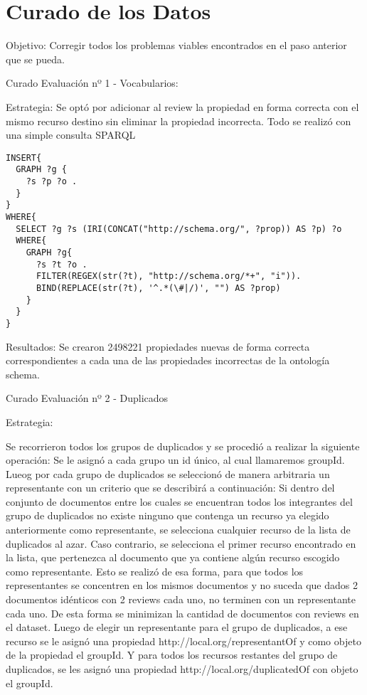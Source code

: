 \chapter{Curado de los Datos}
\label{chapter:curado}

Objetivo:
Corregir todos los problemas viables encontrados en el paso anterior que se pueda.

Curado Evaluación nº 1 - Vocabularios:

Estrategia:
Se optó por adicionar al review la propiedad en forma correcta con el mismo recurso destino sin eliminar la propiedad incorrecta. 
Todo se realizó con una simple consulta SPARQL
\begin{lstlisting}[frame=single]  
INSERT{
  GRAPH ?g {
    ?s ?p ?o .
  }
}
WHERE{
  SELECT ?g ?s (IRI(CONCAT("http://schema.org/", ?prop)) AS ?p) ?o
  WHERE{
    GRAPH ?g{
      ?s ?t ?o .
      FILTER(REGEX(str(?t), "http://schema.org/*+", "i")).
      BIND(REPLACE(str(?t), '^.*(\#|/)', "") AS ?prop)
    }
  }
}
\end{lstlisting}


Resultados:
Se crearon 2498221 propiedades nuevas de forma correcta correspondientes a cada una de las propiedades incorrectas de la ontología 
schema.

Curado Evaluación nº 2 - Duplicados

Estrategia: 

Se recorrieron todos los grupos de duplicados y se procedió a realizar la siguiente operación:
Se le asignó a cada grupo un id único, al cual llamaremos groupId.
Lueog por cada grupo de duplicados se seleccionó de manera arbitraria un representante con un criterio que se describirá a continuación:
Si dentro del conjunto de documentos entre los cuales se encuentran todos los integrantes del grupo de duplicados no existe ninguno 
que contenga un recurso ya elegido anteriormente como representante, se selecciona cualquier recurso de la lista de duplicados al azar.
Caso contrario, se selecciona el primer recurso encontrado en la lista, que pertenezca al documento que ya contiene algún recurso escogido 
como representante.
Esto se realizó de esa forma, para que todos los representantes se concentren en los mismos documentos y no suceda que dados 2 
documentos idénticos con 2 reviews cada uno, no terminen con un representante cada uno. De esta forma se minimizan la cantidad de 
documentos con reviews en el dataset.
Luego de elegir un representante para el grupo de duplicados, a ese recurso se le asignó una propiedad http://local.org/representantOf y 
como objeto de la propiedad el groupId.
Y para todos los recursos restantes del grupo de duplicados, se les asignó una propiedad http://local.org/duplicatedOf con objeto 
el groupId.

